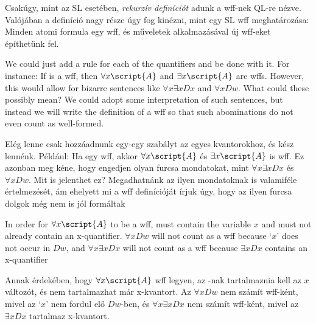 Csakúgy, mint az SL esetében, \emph{rekurzív definíciót} adunk a wff-nek QL-re nézve.
Valójában a definíció nagy része úgy fog kinézni, mint egy SL wff meghatározása: Minden
atomi formula egy wff, és műveletek alkalmazásával új wff-eket építhetünk fel.

We could just add a rule for each of the quantifiers and be done with it. For instance: If  is a wff, then $\forall x\script{A}$ and $\exists x\script{A}$ are wffs. However, this would allow for bizarre sentences like $\forall x\exists x Dx$ and $\forall x Dw$. What could these possibly mean? We could adopt some interpretation of such sentences, but instead we will write the definition of a wff so that such abominations do not even count as well-formed.

Elég lenne csak hozzáadnunk egy-egy szabályt az egyes kvantorokhoz, és kész lennénk. Például: Ha  egy wff, akkor $\forall x\script{A}$ és $\exists x\script{A}$ is wff. Ez azonban meg kéne, hogy engedjen olyan furcsa mondatokat, mint  $\forall x\exists x Dx$ és $\forall x Dw$. Mit is jelenthet ez? Megadhatnánk az ilyen mondatoknak is valamiféle értelmezését, ám ehelyett mi a wff definícióját írjuk úgy, hogy az ilyen furcsa dolgok még nem is jól formáltak

In order for $\forall x\script{A}$ to be a wff,  must contain the variable $x$ and must not already contain an x-quantifier. $\forall x Dw$ will not count as a wff because `$x$' does not occur in $Dw$, and $\forall x \exists x Dx$ will not count as a wff because $\exists x Dx$ contains an x-quantifier

Annak érdekében, hogy $\forall x\script{A}$ wff legyen, az -nak tartalmaznia kell az $x$ változót, és nem tartalmazhat már x-kvantort. Az $\forall x Dw$ nem számít wff-ként, mivel az `$x$' nem fordul elő $Dw$-ben, és $\forall x \exists x Dx$ nem számít wff-ként, mivel az $\exists x Dx$ tartalmaz x-kvantort.

